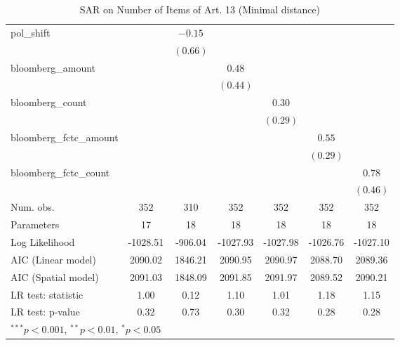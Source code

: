 \begin{table}[!h]
\begin{center}
\begin{tabular}{l c c c c c c }
pol\_shift              &              & $-0.15$      &              &              &              &              \\
                        &              & $(0.66)$     &              &              &              &              \\
bloomberg\_amount       &              &              & $0.48$       &              &              &              \\
                        &              &              & $(0.44)$     &              &              &              \\
bloomberg\_count        &              &              &              & $0.30$       &              &              \\
                        &              &              &              & $(0.29)$     &              &              \\
bloomberg\_fctc\_amount &              &              &              &              & $0.55$       &              \\
                        &              &              &              &              & $(0.29)$     &              \\
bloomberg\_fctc\_count  &              &              &              &              &              & $0.78$       \\
                        &              &              &              &              &              & $(0.46)$     \\
\midrule
Num. obs.               & 352          & 310          & 352          & 352          & 352          & 352          \\
Parameters              & 17           & 18           & 18           & 18           & 18           & 18           \\
Log Likelihood          & -1028.51     & -906.04      & -1027.93     & -1027.98     & -1026.76     & -1027.10     \\
AIC (Linear model)      & 2090.02      & 1846.21      & 2090.95      & 2090.97      & 2088.70      & 2089.36      \\
AIC (Spatial model)     & 2091.03      & 1848.09      & 2091.85      & 2091.97      & 2089.52      & 2090.21      \\
LR test: statistic      & 1.00         & 0.12         & 1.10         & 1.01         & 1.18         & 1.15         \\
LR test: p-value        & 0.32         & 0.73         & 0.30         & 0.32         & 0.28         & 0.28         \\
\bottomrule
\multicolumn{7}{l}{\scriptsize{$^{***}p<0.001$, $^{**}p<0.01$, $^*p<0.05$}}
\end{tabular}
\caption{SAR on Number of Items of Art. 13 (Minimal distance)}
\label{table:coefficients}
\end{center}
\end{table}
